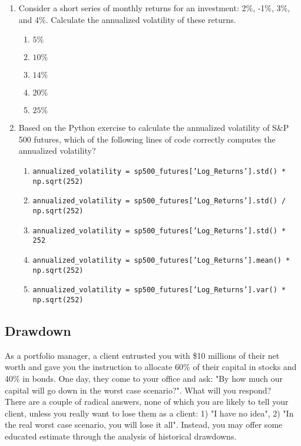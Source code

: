 \documentclass{article}
\begin{document}
\begin{enumerate}
    \item Consider a short series of monthly returns for an investment: 2\%, -1\%, 3\%, and 4\%. Calculate the annualized volatility of these returns.
    \begin{enumerate}
        \item \(5\%\)
        \item \(10\%\)
        \item \(14\%\)
        \item \(20\%\)
        \item \(25\%\)
    \end{enumerate}

    \item Based on the Python exercise to calculate the annualized volatility of S\&P 500 futures, which of the following lines of code correctly computes the annualized volatility?
    \begin{enumerate}
        \item \texttt{annualized\_volatility = sp500\_futures['Log\_Returns'].std() * np.sqrt(252)}
        \item \texttt{annualized\_volatility = sp500\_futures['Log\_Returns'].std() / np.sqrt(252)}
        \item \texttt{annualized\_volatility = sp500\_futures['Log\_Returns'].std() * 252}
        \item \texttt{annualized\_volatility = sp500\_futures['Log\_Returns'].mean() * np.sqrt(252)}
        \item \texttt{annualized\_volatility = sp500\_futures['Log\_Returns'].var() * np.sqrt(252)}
    \end{enumerate}
\end{enumerate}

\subsection{Drawdown}

As a portfolio manager, a client entrusted you with \$10 millions of their net worth and gave you the instruction to allocate 60\% of their capital in stocks and 40\% in bonds. One day, they come to your office and ask: "By how much our capital will go down in the worst case scenario?". What will you respond? \\

There are a couple of radical answers, none of which you are likely to tell your client, unless you really want to lose them as a client: 1) "I have no idea", 2) "In the real worst case scenario, you will lose it all". Instead, you may offer some educated estimate through the analysis of historical drawdowns. \\
\end{document}
